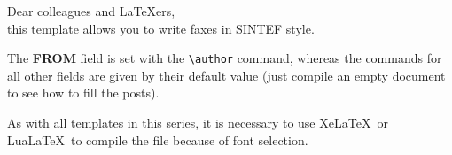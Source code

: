 \documentclass[unrestricted]{sinteffax}
\author{Federico Zenith}
\begin{document}
\frontmatter
Dear colleagues and \LaTeX ers,\\
this template allows you to write faxes in SINTEF style.

The \textbf{\small FROM} field is set with the \verb|\author| command, whereas
the commands for all other fields are given by their default value (just compile
an empty document to see how to fill the posts).

As with all templates in this series, it is necessary to use Xe\LaTeX\ or
Lua\LaTeX\ to compile the file because of font selection.
\end{document}
